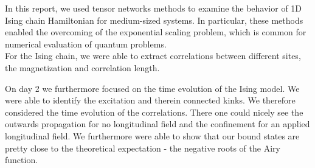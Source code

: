 In this report, we used tensor networks methods to examine the behavior of 1D Ising chain Hamiltonian for medium-sized systems. In particular, these methods enabled the overcoming of the exponential scaling problem, which is common for numerical evaluation of quantum problems.\\
For the Ising chain, we were able to extract correlations between different sites, the magnetization and correlation length.

On day 2 we furthermore focused on the time evolution of the Ising model.
We were able to identify the excitation and therein connected kinks.
We therefore considered the time evolution of the correlations.
There one could nicely see the outwards propagation for no longitudinal field and the confinement for an applied longitudinal field.
We furthermore were able to show that our bound states are pretty close to the theoretical expectation - the negative roots of the Airy function.